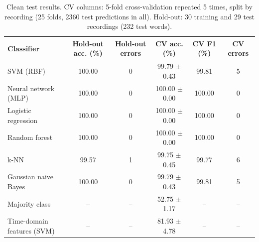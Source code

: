 \begin{table}[H]\centering\small
\caption{Clean test results. CV columns: 5-fold cross-validation repeated 5 times, split by recording (25 folds, 2360 test predictions in all). Hold-out: 30 training and 29 test recordings (232 test words).}\label{tab:clean}
\setlength{\tabcolsep}{4pt}\begin{tabular}{lccccc}\toprule
Classifier & Hold-out acc. (\%) & Hold-out errors & CV acc. (\%) & CV F1 (\%) & CV errors\\\midrule
SVM (RBF) & 100.00 & 0 & 99.79 $\pm$ 0.43 & 99.81 & 5\\
Neural network (MLP) & 100.00 & 0 & 100.00 $\pm$ 0.00 & 100.00 & 0\\
Logistic regression & 100.00 & 0 & 100.00 $\pm$ 0.00 & 100.00 & 0\\
Random forest & 100.00 & 0 & 100.00 $\pm$ 0.00 & 100.00 & 0\\
k-NN & 99.57 & 1 & 99.75 $\pm$ 0.45 & 99.77 & 6\\
Gaussian naive Bayes & 100.00 & 0 & 99.79 $\pm$ 0.43 & 99.81 & 5\\
\midrule
Majority class & -- & -- & 52.75 $\pm$ 1.17 & -- & --\\
Time-domain features (SVM) & -- & -- & 81.93 $\pm$ 4.78 & -- & --\\
\bottomrule\end{tabular}\end{table}
